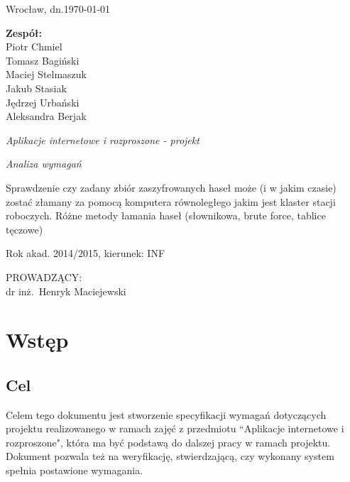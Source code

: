 \documentclass[a4paper,10pt]{article}
\begin{document}
\thispagestyle{empty}


\hfill Wrocław, dn.\today\\
\begin{minipage}[c]{0.4\columnwidth}
  \textbf{Zespół:}\\
  Piotr Chmiel\\
  Tomasz Bagiński\\
  Maciej Stelmaszuk\\
  Jakub Stasiak\\
  Jędrzej Urbański\\
  Aleksandra Berjak\\
  
\end{minipage}
\hfill
\vspace{2.5cm}
\begin{center}
  \begin{LARGE}
    \emph{ Aplikacje internetowe i rozproszone - projekt} \\
  \end{LARGE}
  \begin{Large}
    \emph{ Analiza wymagań} \\
  \end{Large}
  \vspace{1.0cm}
    Sprawdzenie czy zadany zbiór zaszyfrowanych haseł może (i w jakim czasie) zostać złamany za pomocą komputera równoległego jakim jest klaster stacji roboczych. Różne metody łamania haseł (słownikowa, brute force, tablice tęczowe)
\end{center}

\begin{center}
  Rok akad. 2014/2015, kierunek: INF
\end{center}
\vspace{1.2cm}
\begin{flushright}
\begin{minipage}[t]{0.4\columnwidth}
\noindent
PROWADZĄCY:\\
dr inż.~Henryk Maciejewski
\end{minipage}
\end{flushright}
\vfill
\newpage
\tableofcontents{}
\section{Wstęp}
\subsection{Cel}
Celem tego dokumentu jest stworzenie specyfikacji wymagań dotyczących projektu realizowanego w ramach zajęć z przedmiotu  ``Aplikacje internetowe i rozproszone", która ma być podstawą do dalszej pracy w ramach projektu. Dokument pozwala też na weryfikację, stwierdzającą, czy wykonany system spełnia postawione wymagania.
\end{document}
